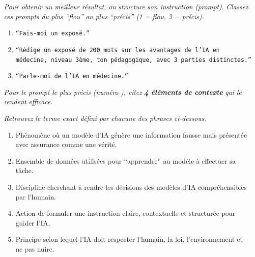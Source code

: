 \documentclass[11pt]{article}
\begin{document}
\begin{exercice}
\emph{Pour obtenir un meilleur résultat, on structure son instruction (prompt). Classez ces prompts du plus ``flou'' au plus ``précis'' (1 = flou, 3 = précis).}
\begin{enumerate}
    \item \texttt{``Fais-moi un exposé.''}
    \item \texttt{``Rédige un exposé de 200 mots sur les avantages de l'IA en médecine, niveau 3ème, ton pédagogique, avec 3 parties distinctes.''}
    \item \texttt{``Parle-moi de l'IA en médecine.''}
\end{enumerate}
\emph{Pour le prompt le plus précis (numéro \underline{\hspace{0.5cm}}), citez \textbf{4 éléments de contexte} qui le rendent efficace.}
\end{exercice}

\begin{exercice}
\emph{Retrouvez le terme exact défini par chacune des phrases ci-dessous.}
\begin{enumerate}
    \item Phénomène où un modèle d'IA génère une information fausse mais présentée avec assurance comme une vérité.
    \item Ensemble de données utilisées pour ``apprendre'' au modèle à effectuer sa tâche.
    \item Discipline cherchant à rendre les décisions des modèles d'IA compréhensibles par l'humain.
    \item Action de formuler une instruction claire, contextuelle et structurée pour guider l'IA.
    \item Principe selon lequel l'IA doit respecter l'humain, la loi, l'environnement et ne pas nuire.
\end{enumerate}
\end{exercice}
\end{document}
